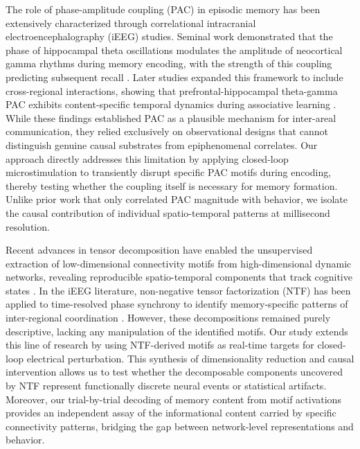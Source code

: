 \documentclass{article}
\begin{document}
The role of phase-amplitude coupling (PAC) in episodic memory has been extensively characterized through correlational intracranial electroencephalography (iEEG) studies. Seminal work demonstrated that the phase of hippocampal theta oscillations modulates the amplitude of neocortical gamma rhythms during memory encoding, with the strength of this coupling predicting subsequent recall \cite{Canolty2006, Axmacher2010}. Later studies expanded this framework to include cross-regional interactions, showing that prefrontal-hippocampal theta-gamma PAC exhibits content-specific temporal dynamics during associative learning \cite{Tort2010, Lega2012}. While these findings established PAC as a plausible mechanism for inter-areal communication, they relied exclusively on observational designs that cannot distinguish genuine causal substrates from epiphenomenal correlates. Our approach directly addresses this limitation by applying closed-loop microstimulation to transiently disrupt specific PAC motifs during encoding, thereby testing whether the coupling itself is necessary for memory formation. Unlike prior work that only correlated PAC magnitude with behavior, we isolate the causal contribution of individual spatio-temporal patterns at millisecond resolution.

Recent advances in tensor decomposition have enabled the unsupervised extraction of low-dimensional connectivity motifs from high-dimensional dynamic networks, revealing reproducible spatio-temporal components that track cognitive states \cite{Cichocki2009, Williams2012}. In the iEEG literature, non-negative tensor factorization (NTF) has been applied to time-resolved phase synchrony to identify memory-specific patterns of inter-regional coordination \cite{Liu2020, Liu2021}. However, these decompositions remained purely descriptive, lacking any manipulation of the identified motifs. Our study extends this line of research by using NTF-derived motifs as real-time targets for closed-loop electrical perturbation. This synthesis of dimensionality reduction and causal intervention allows us to test whether the decomposable components uncovered by NTF represent functionally discrete neural events or statistical artifacts. Moreover, our trial-by-trial decoding of memory content from motif activations provides an independent assay of the informational content carried by specific connectivity patterns, bridging the gap between network-level representations and behavior.
\end{document}
